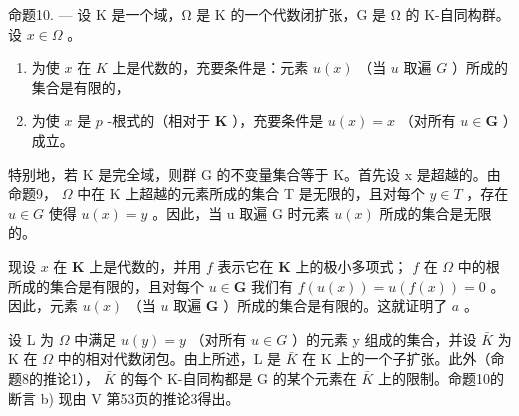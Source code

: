命题10. --- 设 K 是一个域，Ω 是 K 的一个代数闭扩张，G 是 Ω 的 K-自同构群。设 \(x \in \Omega\) 。

\begin{enumerate}
\def\labelenumi{\alph{enumi})}
\item
  为使 \(x\) 在 \(K\) 上是代数的，充要条件是：元素 \(u(x)\) （当 \(u\) 取遍 \(G\) ）所成的集合是有限的，
\item
  为使 \(x\) 是 \(p\) -根式的（相对于 \(\mathbf{K}\) ），充要条件是 \(u(x) = x\) （对所有 \(u \in \mathbf{G}\) ）成立。
\end{enumerate}

特别地，若 K 是完全域，则群 G 的不变量集合等于 K。首先设 x 是超越的。由命题9， \(\Omega\) 中在 K 上超越的元素所成的集合 T 是无限的，且对每个 \(y \in T\) ，存在 \(u \in G\) 使得 \(u(x) = y\) 。因此，当 u 取遍 G 时元素 \(u(x)\) 所成的集合是无限的。

现设 \(x\) 在 \(\mathbf{K}\) 上是代数的，并用 \(f\) 表示它在 \(\mathbf{K}\) 上的极小多项式； \(f\) 在 \(\Omega\) 中的根所成的集合是有限的，且对每个 \(u \in \mathbf{G}\) 我们有 \(f(u(x)) = u(f(x)) = 0\) 。因此，元素 \(u(x)\) （当 \(u\) 取遍 \(\mathbf{G}\) ）所成的集合是有限的。这就证明了 \(a\) 。

设 L 为 \(\Omega\) 中满足 \(u(y)=y\) （对所有 \(u\in G\) ）的元素 y 组成的集合，并设 \(\bar{K}\) 为 K 在 \(\Omega\) 中的相对代数闭包。由上所述，L 是 \(\bar{K}\) 在 K 上的一个子扩张。此外（命题8的推论1）， \(\bar{K}\) 的每个 K-自同构都是 G 的某个元素在 \(\bar{K}\) 上的限制。命题10的断言 b) 现由 V 第53页的推论3得出。

